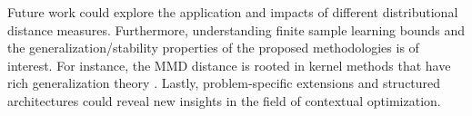 Future work could explore the application and impacts of different distributional  distance measures. Furthermore, understanding finite sample learning bounds and the generalization/stability properties of the proposed methodologies is of interest. For instance, the MMD distance is rooted in kernel methods that have rich generalization theory \citep{JMLR:v13:gretton12a}. Lastly, problem-specific extensions and structured architectures could reveal new insights in the field of contextual optimization. 


